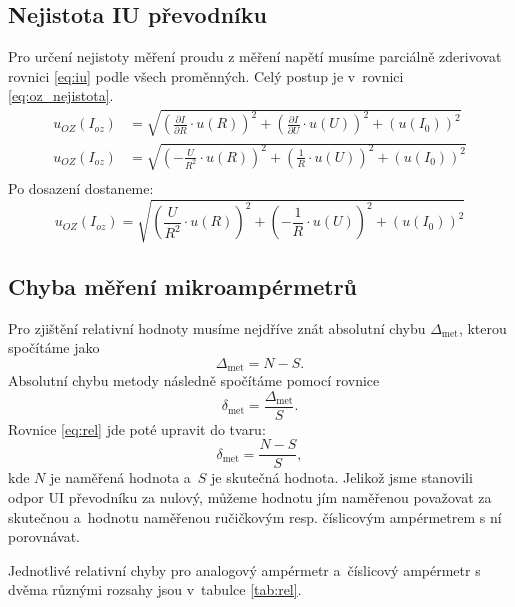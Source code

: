 \documentclass[a4paper,12pt]{article}   %
\begin{document}
\subsection{Nejistota IU převodníku}
Pro určení nejistoty měření proudu z měření napětí musíme parciálně zderivovat rovnici \ref{eq:iu} podle všech proměnných. Celý postup je v~rovnici \ref{eq:oz_nejistota}.
\begin{equation}
    \begin{split}
        u_{OZ}(I_{oz})&=\sqrt{\left(\frac{\partial I}{\partial R} \cdot u(R)\right)^2+\left(\frac{\partial I}{\partial U} \cdot u(U)\right)^2+\left(u(I_0)\right)^2}\\
        u_{OZ}(I_{oz})&=\sqrt{\left(-\frac{U}{R^2}\cdot u(R)\right)^2+\left(\frac{1}{R}\cdot u(U)\right)^2+\left(u(I_0)\right)^2}\\
    \end{split}
    \label{eq:oz_nejistota}
\end{equation}
Po dosazení dostaneme:
\begin{equation*}
    u_{OZ}(I_{oz})=\sqrt{\left(\frac{U}{R^2}\cdot u(R)\right)^2+\left(-\frac{1}{R}\cdot u(U)\right)^2+\left(u(I_0)\right)^2}
\end{equation*}

\subsection{Chyba měření mikroampérmetrů}
Pro zjištění relativní hodnoty musíme nejdříve znát absolutní chybu $\Delta_{\textrm{met}}$, kterou spočítáme jako
\begin{equation}
    \Delta_{\textrm{met}} = N - S.
    \label{eq:abs}
\end{equation}
Absolutní chybu metody následně spočítáme pomocí rovnice 
\begin{equation}
    \delta_{\textrm{met}} = \frac{\Delta_{\textrm{met}}}{S}.
    \label{eq:rel}
\end{equation}
Rovnice \ref{eq:rel} jde poté upravit do tvaru:
\begin{equation}
    \delta_{\textrm{met}} = \frac{N-S}{S},
\end{equation}
kde $N$ je naměřená hodnota a~$S$ je skutečná hodnota. Jelikož jsme stanovili odpor UI převodníku za nulový, můžeme hodnotu jím naměřenou považovat za skutečnou a~hodnotu naměřenou ručičkovým resp. číslicovým ampérmetrem s ní porovnávat.

Jednotlivé relativní chyby pro analogový ampérmetr a~číslicový ampérmetr s dvěma různými rozsahy jsou v~tabulce \ref{tab:rel}.
\end{document}
